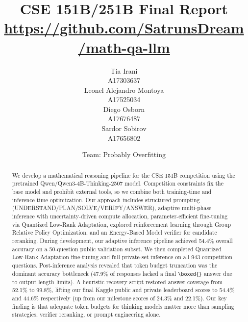 \documentclass{article}
\title{
CSE 151B/251B Final Report
\\
{\small \url{https://github.com/SatrunsDream/math-qa-llm}} %
}
\author{%
    Tia Irani\\
    A17303637\\
    \And
    Leonel Alejandro Montoya\\
    A17525034 \\
    \And
    Diego Osborn \\
    A17676487 \\
    \And
    Sardor Sobirov\\
    A17656802\\
    \and
    Team: Probably Overfitting
}
\begin{document}
\maketitle

\begin{abstract}
We develop a mathematical reasoning pipeline for the CSE 151B competition using the pretrained Qwen/Qwen3-4B-Thinking-2507 model. Competition constraints fix the base model and prohibit external tools, so we combine both training-time and inference-time optimization. Our approach includes structured prompting (UNDERSTAND/PLAN/SOLVE/VERIFY/ANSWER), adaptive multi-phase inference with uncertainty-driven compute allocation, parameter-efficient fine-tuning via Quantized Low-Rank Adaptation, explored reinforcement learning through Group Relative Policy Optimization, and an Energy-Based Model verifier for candidate reranking. During development, our adaptive inference pipeline achieved 54.4\% overall accuracy on a 50-question public validation subset. We then completed Quantized Low-Rank Adaptation fine-tuning and full private-set inference on all 943 competition questions. Post-inference analysis revealed that token budget truncation was the dominant accuracy bottleneck (47.9\% of responses lacked a final \texttt{\textbackslash boxed\{\}} answer due to output length limits). A heuristic recovery script restored answer coverage from 52.1\% to 99.8\%, lifting our final Kaggle public and private leaderboard scores to 54.4\% and 44.6\% respectively (up from our milestone scores of 24.3\% and 22.1\%). Our key finding is that adequate token budgets for thinking models matter more than sampling strategies, verifier reranking, or prompt engineering alone.
\end{abstract}
\end{document}
